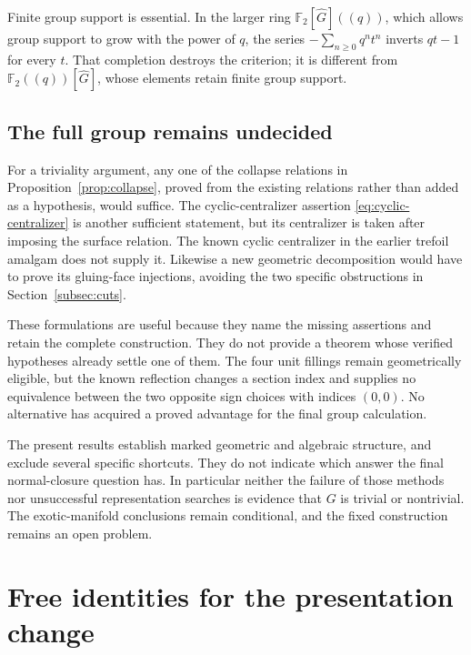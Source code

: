 \documentclass[11pt]{amsart}
\theoremstyle{definition}
\theoremstyle{remark}
\newcommand{\Ftwo}{\mathbb F_2}
\begin{document}
Finite group support is essential. In the larger ring
$\Ftwo[\widehat G]((q))$, which allows group support to grow
with the power of $q$, the series
$-\sum_{n\ge0}q^nt^n$ inverts $qt-1$ for every $t$.
That completion destroys the criterion; it is different from
$\Ftwo((q))[\widehat G]$, whose elements retain finite group
support.

\subsection*{The full group remains undecided}
For a triviality argument, any one of the collapse relations in
Proposition~\ref{prop:collapse}, proved from the existing relations
rather than added as a hypothesis, would suffice. The cyclic-centralizer
assertion \eqref{eq:cyclic-centralizer} is another sufficient statement,
but its centralizer is taken after imposing the surface relation.
The known cyclic centralizer in the earlier trefoil amalgam does not
supply it. Likewise a new geometric decomposition would have to prove
its gluing-face injections, avoiding the two specific obstructions in
Section~\ref{subsec:cuts}.

These formulations are useful because they name the missing assertions
and retain the complete construction. They do not provide a theorem
whose verified hypotheses already settle one of them. The four unit
fillings remain geometrically eligible, but the known reflection changes
a section index and supplies no equivalence between the two opposite
sign choices with indices $(0,0)$. No alternative has acquired a proved
advantage for the final group calculation.

The present results establish marked geometric and algebraic structure,
and exclude several specific shortcuts. They do not indicate which
answer the final normal-closure question has. In particular neither
the failure of those methods nor unsuccessful representation searches
is evidence that $G$ is trivial or nontrivial. The exotic-manifold
conclusions remain conditional, and the fixed construction remains an
open problem.

\appendix
\section{Free identities for the presentation change}\label{app:identities}
\end{document}
